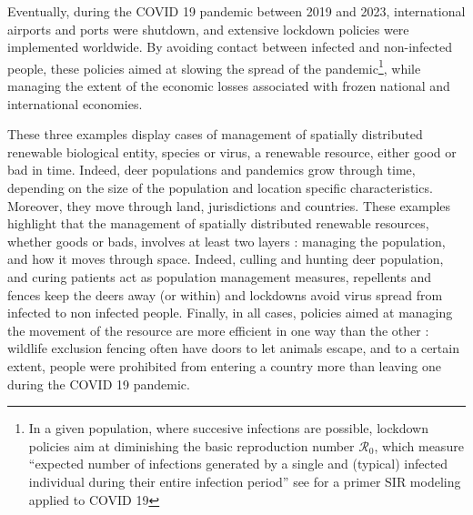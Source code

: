 Eventually, during the COVID 19 pandemic between 2019 and 2023, international airports and ports were shutdown, and extensive lockdown policies were implemented worldwide. By avoiding contact between infected and non-infected people, these policies aimed at slowing the spread of the pandemic\footnote{In a given population, where succesive infections are possible, lockdown policies aim at diminishing the basic reproduction number $\mathcal{R}_0$, which measure ``expected number of infections generated by a single and (typical) infected individual during their entire infection period'' see \cite{saldana_modeling_2022} for a primer SIR modeling applied to COVID 19}, while managing the extent of the economic losses associated with frozen national and international economies. 

These three examples display cases of management of spatially distributed renewable biological entity, species or virus, a renewable resource, either good or bad in time. Indeed, deer populations and pandemics grow through time, depending on the size of the population and location specific characteristics. Moreover, they move through land, jurisdictions and countries. These examples highlight that the management of spatially distributed renewable resources, whether goods or bads, involves at least two layers : managing the population, and how it moves through space. Indeed, culling and hunting deer population, and curing patients act as population management measures, repellents and fences keep the deers away (or within) and lockdowns avoid virus spread from infected to non infected people. Finally, in all cases, policies aimed at managing the movement of the resource are more efficient in one way than the other : wildlife exclusion fencing often have doors to let animals escape, and to a certain extent, people were prohibited from entering a country more than leaving one during the COVID 19 pandemic. 

